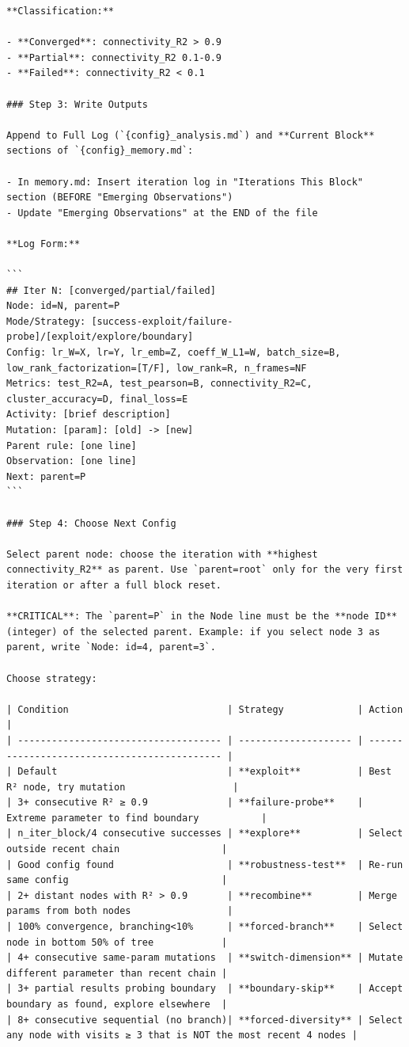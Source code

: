 \documentclass[10pt,twocolumn]{article}
\begin{document}
\begin{small}
\begin{verbatim}
**Classification:**

- **Converged**: connectivity_R2 > 0.9
- **Partial**: connectivity_R2 0.1-0.9
- **Failed**: connectivity_R2 < 0.1

### Step 3: Write Outputs

Append to Full Log (`{config}_analysis.md`) and **Current Block** sections of `{config}_memory.md`:

- In memory.md: Insert iteration log in "Iterations This Block" section (BEFORE "Emerging Observations")
- Update "Emerging Observations" at the END of the file

**Log Form:**

```
## Iter N: [converged/partial/failed]
Node: id=N, parent=P
Mode/Strategy: [success-exploit/failure-probe]/[exploit/explore/boundary]
Config: lr_W=X, lr=Y, lr_emb=Z, coeff_W_L1=W, batch_size=B, low_rank_factorization=[T/F], low_rank=R, n_frames=NF
Metrics: test_R2=A, test_pearson=B, connectivity_R2=C, cluster_accuracy=D, final_loss=E
Activity: [brief description]
Mutation: [param]: [old] -> [new]
Parent rule: [one line]
Observation: [one line]
Next: parent=P
```

### Step 4: Choose Next Config

Select parent node: choose the iteration with **highest connectivity_R2** as parent. Use `parent=root` only for the very first iteration or after a full block reset.

**CRITICAL**: The `parent=P` in the Node line must be the **node ID** (integer) of the selected parent. Example: if you select node 3 as parent, write `Node: id=4, parent=3`.

Choose strategy:

| Condition                            | Strategy             | Action                                       |
| ------------------------------------ | -------------------- | -------------------------------------------- |
| Default                              | **exploit**          | Best R² node, try mutation                   |
| 3+ consecutive R² ≥ 0.9              | **failure-probe**    | Extreme parameter to find boundary           |
| n_iter_block/4 consecutive successes | **explore**          | Select outside recent chain                  |
| Good config found                    | **robustness-test**  | Re-run same config                           |
| 2+ distant nodes with R² > 0.9       | **recombine**        | Merge params from both nodes                 |
| 100% convergence, branching<10%      | **forced-branch**    | Select node in bottom 50% of tree            |
| 4+ consecutive same-param mutations  | **switch-dimension** | Mutate different parameter than recent chain |
| 3+ partial results probing boundary  | **boundary-skip**    | Accept boundary as found, explore elsewhere  |
| 8+ consecutive sequential (no branch)| **forced-diversity** | Select any node with visits ≥ 3 that is NOT the most recent 4 nodes |


\end{verbatim}
\end{small}
\end{document}
